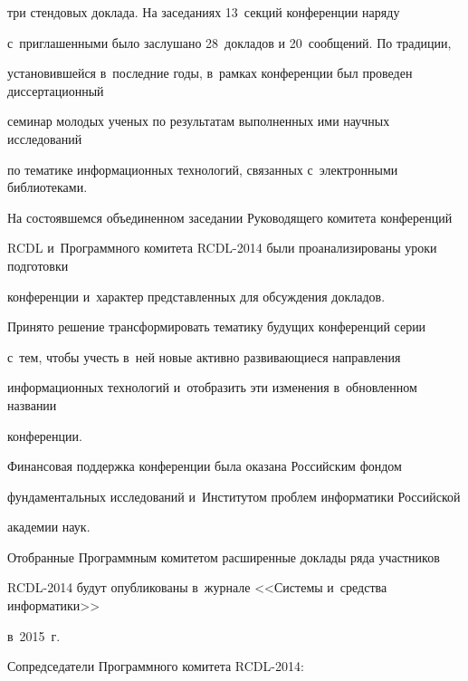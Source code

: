 три стендовых доклада. На заседаниях 13~секций конференции наряду


с~приглашенными было заслушано 28~докладов и 20~сообщений. По традиции,


установившейся в~последние годы, в~рамках конференции был проведен диссертационный


семинар молодых ученых по результатам выполненных ими научных исследований


по тематике информационных технологий, связанных с~электронными библиотеками.





На состоявшемся объединенном заседании Руководящего комитета конференций


RCDL и~Программного комитета RCDL-2014 были проанализированы уроки подготовки


конференции и~характер представленных для обсуждения докладов.


Принято решение трансформировать тематику будущих конференций серии


с~тем, чтобы учесть в~ней новые активно развивающиеся направления


информационных технологий и~отобразить эти изменения в~обновленном названии


конференции.





Финансовая поддержка конференции была оказана Российским фондом


фундаментальных исследований и~Институтом проблем информатики Российской


академии наук.





Отобранные Программным комитетом расширенные доклады ряда участников


RCDL-2014 будут опубликованы в~журнале <<Системы и~средства информатики>>


в~2015~г.










\hspace*{7mm}





\hfill Сопредседатели Программного комитета RCDL-2014:





